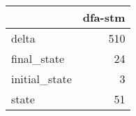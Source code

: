 \begin{tabular}{lr}
\toprule
{} &  dfa-stm \\
\midrule
delta         &      510 \\
final\_state   &       24 \\
initial\_state &        3 \\
state         &       51 \\
\bottomrule
\end{tabular}
